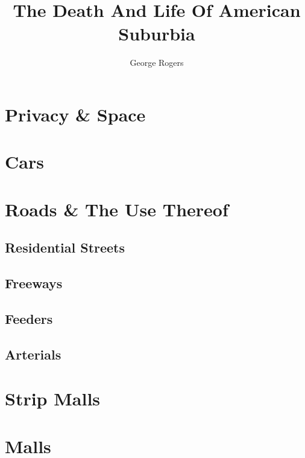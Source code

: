 \documentclass[8pt]{amsbook}
\title{The Death And Life Of American Suburbia}
\author{George Rogers}
\begin{document}
\dominitoc
\maketitle

\tableofcontents
\chapter{Privacy \& Space}
\chapter{Cars}
\chapter{Roads \& The Use Thereof}
\section{Residential Streets}
\section{Freeways}
\section{Feeders}
\section{Arterials}
\chapter{Strip Malls}
\chapter{Malls}
\listoffigures
\end{document}
